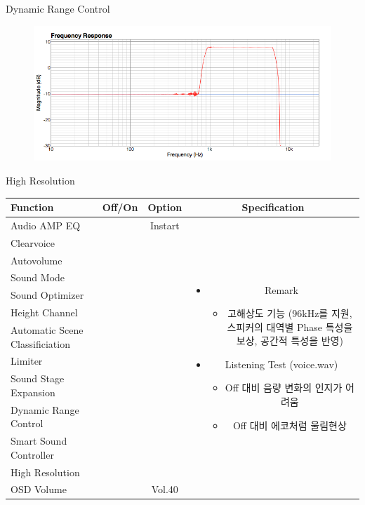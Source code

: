 \documentclass{beamer}
\begin{document}
\begin{frame}[t]{Dynamic Range Control}
\begin{figure}[b]
\includegraphics[height=0.37\textwidth]{figure/drc.png}
\end{figure}

\end{frame}


\begin{frame}[t]{High Resolution}
\begin{tiny}
\begin{tabular}{@{}lccc@{}}
\toprule
Function & Off/On & Option & Specification \\
\midrule
Audio AMP EQ & \color{black}{Off} & Instart &
\multirow{13}{60mm}{
\begin{itemize}
\item Remark
  \begin{itemize}
  \item 고해상도 기능 (96kHz를 지원, 스피커의 대역별 Phase 특성을 보상, 공간적 특성을 반영)
  \end{itemize}
\item Listening Test (voice.wav)
  \begin{itemize}
  \item Off 대비 음량 변화의 인지가 어려움
  \item Off 대비 에코처럼 울림현상
  \end{itemize}
\end{itemize}
} \\
Clearvoice & \color{black}{Off} & & \\
Autovolume & \color{black}{Off} & & \\
Sound Mode & \color{black}{Off} & & \\
Sound Optimizer & \color{black}{Off} & & \\
Height Channel & \color{black}{Off} & & \\
Automatic Scene Classificiation & \color{black}{Off} & & \\
Limiter & \color{black}{Off} & & \\
Sound Stage Expansion & \color{black}{Off} & & \\
Dynamic Range Control & \color{black}{Off} & & \\
Smart Sound Controller & \color{black}{Off} & & \\
High Resolution & \color{blue}{On} & & \\
OSD Volume & \color{blue}{On} & Vol.40 & \\
\midrule
\end{tabular}
\end{tiny}

\end{frame}
\end{document}

